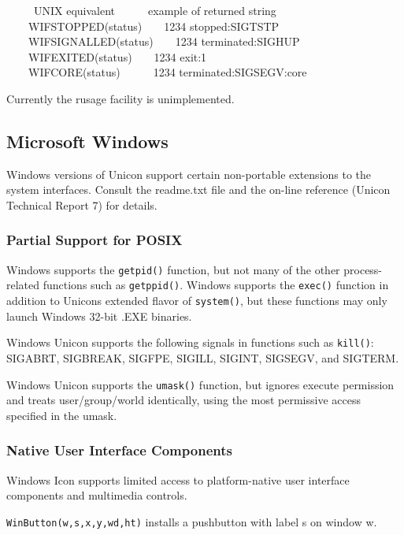 \ \ \ \ \ UNIX equivalent\ \ \ \ \ \ example of returned string\\
 \ \ \ \ WIFSTOPPED(status)\ \ \ \ {\textquotedbl}1234
stopped:SIGTSTP{\textquotedbl} \\
 \ \ \ \ WIFSIGNALLED(status)\ \ \ \ {\textquotedbl}1234
terminated:SIGHUP{\textquotedbl} \\
 \ \ \ \ WIFEXITED(status)\ \ \ \ {\textquotedbl}1234
exit:1{\textquotedbl} \\
 \ \ \ \ WIFCORE(status)\ \ \ \ \ \ {\textquotedbl}1234
terminated:SIGSEGV:core{\textquotedbl} 

Currently the \textsf{rusage} facility is unimplemented.

\subsection[Microsoft Windows]{Microsoft Windows}
Windows versions of Unicon support certain non-portable extensions to
the system interfaces. Consult the readme.txt file and the on-line
reference (Unicon Technical Report 7) for details.

\subsubsection{Partial Support for POSIX}

Windows supports the \texttt{getpid()} function, but not many of the other
process-related functions such as \texttt{getppid()}. Windows supports the
\texttt{exec()} function in addition to Unicon{\textquotesingle}s extended
flavor of \texttt{system()}, but these functions may only launch Windows 32-bit
.EXE binaries.

Windows Unicon supports the following signals in functions such as
\texttt{kill()}: SIGABRT, SIGBREAK, SIGFPE, SIGILL, SIGINT, SIGSEGV, and
SIGTERM.

Windows Unicon supports the \texttt{umask()} function, but ignores execute
permission and treats user/group/world identically, using the most
permissive access specified in the umask.

\subsubsection{Native User Interface Components}

Windows Icon supports limited access to platform-native user interface
components and multimedia controls.

\texttt{WinButton(w,s,x,y,wd,ht)} installs a pushbutton with label s on window w.

